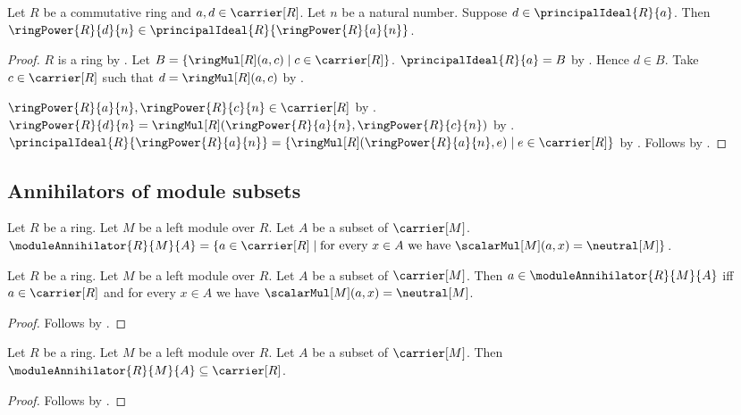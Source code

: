 \begin{theorem}\label{principal_ideal_power_containment}
    Let $R$ be a commutative ring and $a,d\in\carrier[R]$.
    Let $n$ be a natural number.
    Suppose $d\in\principalIdeal{R}{a}$.
    Then
        $\ringPower{R}{d}{n}
            \in\principalIdeal{R}{\ringPower{R}{a}{n}}$.
\end{theorem}
\begin{proof}
    $R$ is a ring by .
    Let $B=\{\ringMul[R](a,c)\mid c\in\carrier[R]\}$.
    $\principalIdeal{R}{a}=B$ by
        .
    Hence $d\in B$.
    Take $c\in\carrier[R]$ such that
        $d=\ringMul[R](a,c)$ by \auto.

    $\ringPower{R}{a}{n},\ringPower{R}{c}{n}\in\carrier[R]$ by
        .
    $\ringPower{R}{d}{n}
        =\ringMul[R](\ringPower{R}{a}{n},
            \ringPower{R}{c}{n})$ by
        .
    $\principalIdeal{R}{\ringPower{R}{a}{n}}
        =\{\ringMul[R](\ringPower{R}{a}{n},e)
            \mid e\in\carrier[R]\}$ by
        .
    Follows by \auto.
\end{proof}

\subsection{Annihilators of module subsets}

\begin{definition}\label{module_annihilator}
    Let $R$ be a ring.
    Let $M$ be a left module over $R$.
    Let $A$ be a subset of $\carrier[M]$.
    $\moduleAnnihilator{R}{M}{A}=
        \{a\in\carrier[R]\mid
            \text{for every $x\in A$ we have
                $\scalarMul[M](a,x)=\neutral[M]$}\}$.
\end{definition}

\begin{proposition}\label{module_annihilator_iff}
    Let $R$ be a ring.
    Let $M$ be a left module over $R$.
    Let $A$ be a subset of $\carrier[M]$.
    Then $a\in\moduleAnnihilator{R}{M}{A}$ iff
        $a\in\carrier[R]$ and
        for every $x\in A$ we have
            $\scalarMul[M](a,x)=\neutral[M]$.
\end{proposition}
\begin{proof}
    Follows by .
\end{proof}

\begin{proposition}\label{module_annihilator_subseteq_carrier}
    Let $R$ be a ring.
    Let $M$ be a left module over $R$.
    Let $A$ be a subset of $\carrier[M]$.
    Then $\moduleAnnihilator{R}{M}{A}\subseteq\carrier[R]$.
\end{proposition}
\begin{proof}
    Follows by .
\end{proof}

